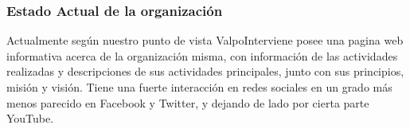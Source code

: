 \documentclass[paper=letter, fontsize=11pt]{scrartcl} %
\numberwithin{equation}{section} %
\numberwithin{figure}{section} %
\numberwithin{table}{section} %
\begin{document}

\subsubsection*{Estado Actual de la organización}
Actualmente según nuestro punto de vista ValpoInterviene posee una pagina web informativa acerca de la organización misma, con información de las actividades realizadas y descripciones de sus actividades principales, junto con sus principios, misión y visión.
Tiene una fuerte interacción en redes sociales en un grado más menos parecido en Facebook y Twitter, y dejando de lado por cierta parte YouTube.



\end{document}
